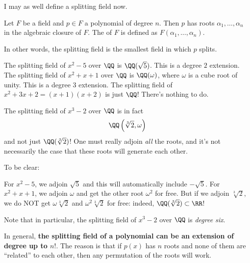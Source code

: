 I may as well define a splitting field now.
\begin{definition}
	Let $F$ be a field and $p \in F$ a polynomial of degree $n$.
	Then $p$ has roots $\alpha_1, \dots, \alpha_n$ in the algebraic closure of $F$.
	The  of $F$ is defined as $F(\alpha_1, \dots, \alpha_n)$.
\end{definition}
In other words, the splitting field is the smallest field in which $p$ splits.
\begin{example}
	\listhack
	\begin{enumerate}[(a)]
		\ii The splitting field of $x^2 - 5$ over $\QQ$ is $\QQ(\sqrt 5)$.
		This is a degree $2$ extension.
		\ii The splitting field of $x^2+x+1$ over $\QQ$ is $\QQ(\omega)$,
		where $\omega$ is a cube root of unity.
		This is a degree $3$ extension.
		\ii The splitting field of $x^2+3x+2 = (x+1)(x+2)$ is just $\QQ$!
		There's nothing to do.
	\end{enumerate}
\end{example}
\begin{example}
	The splitting field of $x^3 - 2$ over $\QQ$ is in fact
	\[ \QQ\left( \sqrt[3]{2}, \omega \right) \]
	and not just $\QQ(\sqrt[3]{2})$!
	One must really adjoin \emph{all} the roots, and it's not necessarily the case that
	these roots will generate each other.

	To be clear:
	\begin{itemize}
	\ii For $x^2-5$, we adjoin $\sqrt 5$ and this will automatically include $-\sqrt 5$.
	\ii For $x^2+x+1$, we adjoin $\omega$ and get the other root $\omega^2$ for free.
	\ii But if we adjoin $\sqrt[3]{2}$, we do NOT get $\omega\sqrt[3]{2}$ and $\omega^2\sqrt[3]{2}$ for free:
	indeed, $\QQ(\sqrt[3]{2}) \subset \RR$!
	\end{itemize}
	Note that in particular, the splitting field of $x^3-2$ over $\QQ$ is \emph{degree six}.
\end{example}

In general,
\textbf{the splitting field of a polynomial can be an extension of degree up to $n!$}.
The reason is that if $p(x)$ has $n$ roots and none of them are ``related'' to each other,
then any permutation of the roots will work.

